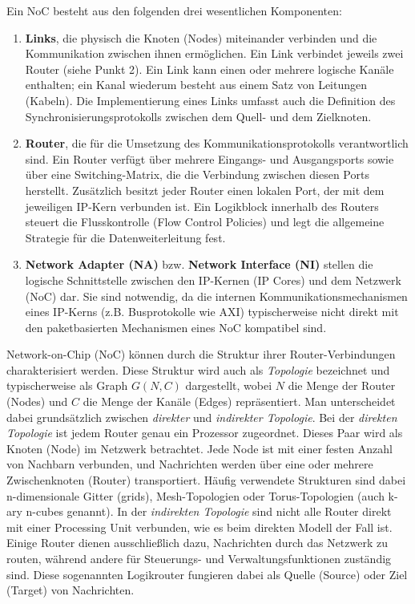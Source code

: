 Ein NoC besteht aus den folgenden drei wesentlichen Komponenten:
\begin{enumerate}
    \item \textbf{Links}, die physisch die Knoten (Nodes) miteinander verbinden und die Kommunikation zwischen ihnen ermöglichen. Ein Link verbindet jeweils zwei Router (siehe Punkt 2). Ein Link kann einen oder mehrere logische Kanäle enthalten; ein Kanal wiederum besteht aus einem Satz von Leitungen (Kabeln). Die Implementierung eines Links umfasst auch die Definition des Synchronisierungsprotokolls zwischen dem Quell- und dem Zielknoten.
    \item \textbf{Router}, die für die Umsetzung des Kommunikationsprotokolls verantwortlich sind. Ein Router verfügt über mehrere Eingangs- und Ausgangsports sowie über eine Switching-Matrix, die die Verbindung zwischen diesen Ports herstellt. Zusätzlich besitzt jeder Router einen lokalen Port, der mit dem jeweiligen IP-Kern verbunden ist. Ein Logikblock innerhalb des Routers steuert die Flusskontrolle (Flow Control Policies) und legt die allgemeine Strategie für die Datenweiterleitung fest.
    \item \textbf{Network Adapter (NA)} bzw. \textbf{Network Interface (NI)} stellen die logische Schnittstelle zwischen den IP-Kernen (IP Cores) und dem Netzwerk (NoC) dar. Sie sind notwendig, da die internen Kommunikationsmechanismen eines IP-Kerns (z.B. Busprotokolle wie AXI) typischerweise nicht direkt mit den paketbasierten Mechanismen eines NoC kompatibel sind.
\end{enumerate}

Network-on-Chip (NoC) können durch die Struktur ihrer Router-Verbindungen charakterisiert werden. Diese Struktur wird auch als \textit{Topologie} bezeichnet und typischerweise als Graph $G(N, C)$ dargestellt, wobei $N$ die Menge der Router (Nodes) und $C$ die Menge der Kanäle (Edges) repräsentiert. Man unterscheidet dabei grundsätzlich zwischen \textit{direkter} und \textit{indirekter Topologie}.
Bei der \textit{direkten Topologie} ist jedem Router genau ein Prozessor zugeordnet. Dieses Paar wird als Knoten (Node) im Netzwerk betrachtet. Jede Node ist mit einer festen Anzahl von Nachbarn verbunden, und Nachrichten werden über eine oder mehrere Zwischenknoten (Router) transportiert. Häufig verwendete Strukturen sind dabei n-dimensionale Gitter (grids), Mesh-Topologien oder Torus-Topologien (auch k-ary n-cubes genannt).
In der \textit{indirekten Topologie} sind nicht alle Router direkt mit einer Processing Unit verbunden, wie es beim direkten Modell der Fall ist. Einige Router dienen ausschließlich dazu, Nachrichten durch das Netzwerk zu routen, während andere für Steuerungs- und Verwaltungsfunktionen zuständig sind. Diese sogenannten Logikrouter fungieren dabei als Quelle (Source) oder Ziel (Target) von Nachrichten.

